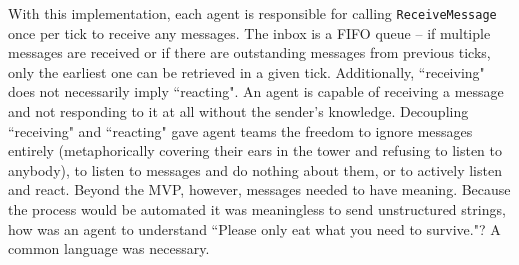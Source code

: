 With this implementation, each agent is responsible for calling \texttt{ReceiveMessage} once per tick to receive any messages. The inbox is a FIFO queue -- if multiple messages are received or if there are outstanding messages from previous ticks, only the earliest one can be retrieved in a given tick.
Additionally, ``receiving" does not necessarily imply ``reacting". An agent is capable of receiving a message and not responding to it at all without the sender's knowledge. Decoupling ``receiving" and ``reacting" gave agent teams the freedom to ignore messages entirely (metaphorically covering their ears in the tower and refusing to listen to anybody), to listen to messages and do nothing about them, or to actively listen and react. \newline
Beyond the MVP, however, messages needed to have meaning. Because the process would be automated it was meaningless to send unstructured strings, how was an agent to understand ``Please only eat what you need to survive."? \newline
A common language was necessary.

